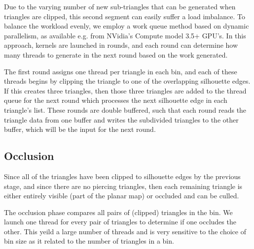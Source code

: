 \documentclass[review]{acmsiggraph}
\begin{document}
Due to the varying number of new sub-triangles that can be generated when
triangles are clipped, this second segment can easily suffer a load imbalance.
To balance the workload evenly, we employ a work queue method based on dynamic
parallelism, as available e.g. from NVidia's Compute model 3.5+ GPU's. In this
approach, kernels are launched in rounds, and each round can determine how many
threads to generate in the next round based on the work generated.

The first round assigns one thread per triangle in each bin, and each of these
threads begins by clipping the triangle to one of the overlapping silhouette
edges. If this creates three triangles, then those three triangles are added to
the thread queue for the next round which processes the next silhouette edge
in each triangle's list. These rounds are double buffered, such that each
round reads the triangle data from one buffer and writes the subdivided
triangles to the other buffer, which will be the input for the next round.

\subsection{Occlusion} \label{sec:occlusion}

Since all of the triangles have been clipped to silhouette edges by the
previous stage, and since there are no piercing triangles, then each remaining
triangle is either entirely visible (part of the planar map) or occluded and
can be culled.

The occlusion phase compares all pairs of (clipped) triangles in the bin. We
launch one thread for every pair of triangles to determine if one occludes the
other. This yeild a large number of threads and is very sensitive to the
choice of bin size as it related to the number of triangles in a bin.


\end{document}
